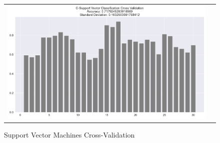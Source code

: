 \documentclass[conference]{IEEEtran}
\begin{document}
\begin{figure}[!h]
	\centering
	\begin{center}
		\begin{tabular}{cc}
			\includegraphics[scale=0.2]{pictures/pic_18.png}&
		\end{tabular}
	\end{center}
	\caption{Support Vector Machines Cross-Validation}
	\label{fig:18}
\end{figure}
\end{document}
